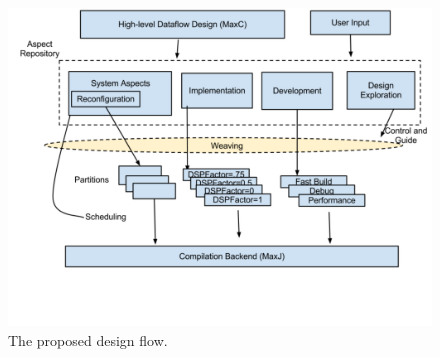 \begin{figure}[!h]
  \includegraphics[scale=0.27, trim=0 0 0 0]{figs/design-flow}
  \caption{The proposed design flow.}
  \label{fig:design-flow}
\end{figure}
